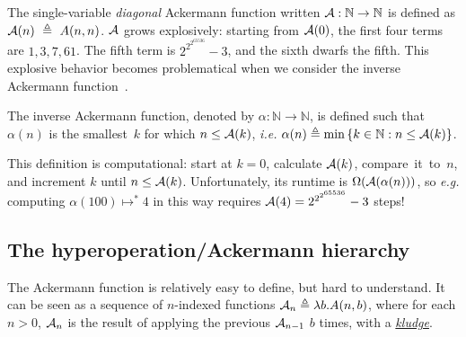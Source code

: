 The single-variable \emph{diagonal} Ackermann function written $\mathcal{A} : \mathbb{N} \to \mathbb{N}$ is defined as $\mathcal{A}(n)~\triangleq~A(n, n)$.  
$\mathcal{A}$ grows explosively: starting from $\mathcal{A}(0)$, the first four terms are $1, 3, 7, 61$.  The fifth term is $2^{2^{2^{65536}}}-3$, and the sixth dwarfs the fifth.
This explosive behavior becomes problematical when we consider
the inverse Ackermann function~\cite{chazelle,tarjan}.
\begin{defn} \label{defn: inv_ack}
The inverse Ackermann function, denoted by $\alpha: \mathbb{N}\to \mathbb{N}$, is defined such that $\alpha(n)$ is the smallest~$k$ for
which $n \le \mathcal{A}(k)$, \emph{i.e.} $\alpha(n) \triangleq \min\left\{k\in \mathbb{N} : n \le \mathcal{A}(k)\right\}$.
\end{defn}
\noindent This definition is computational: start at $k=0$, calculate $\mathcal{A}(k)$,
compare~it~to~$n$, and increment $k$ until $n \le \mathcal{A}(k)$.
Unfortunately, its runtime is $\Omega(\mathcal{A}(\alpha(n)))$,
so \emph{e.g.} computing $\alpha(100) \mapsto^{*} 4$ in this way requires
$\mathcal{A}(4) = 2^{2^{2^{65536}}}-3$ steps!

\subsection{The hyperoperation/Ackermann hierarchy}

The Ackermann function is relatively easy to define, but hard to
understand.  It can be seen as
a sequence of $n$-indexed functions $\mathcal{A}_n \triangleq \lambda b.A(n,b)$, where for each $n>0$, $\mathcal{A}_n$ is the result of applying the previous $\mathcal{A}_{n-1}$ $b$ times, with a 
\href{https://github.com/inv-ack/inv-ack/blob/7270e64a2600b771f2b1b1b151f7d13fb2ae6c97/repeater.v#L161-L177}{\color{blue}\emph{kludge}}. %

